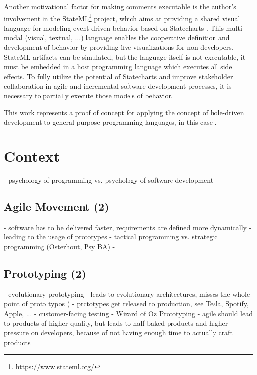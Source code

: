Another motivational factor for making comments executable is the author's involvement in the StateML\footnote{\url{https://www.stateml.org/}} project, which aims at providing a shared visual language for modeling event-driven behavior based on Statecharts \cite{Harel:1987}.
This multi-modal (visual, textual, $\dotsc$) language enables the cooperative definition and development of behavior by providing live-visualizations for non-developers.
StateML artifacts can be simulated, but the language itself is not executable, it must be embedded in a host programming language which executes all side effects.
To fully utilize the potential of Statecharts and improve stakeholder collaboration in agile and incremental software development processes, it is necessary to partially execute those models of behavior.

This work represents a proof of concept for applying the concept of hole-driven development to general-purpose programming languages, in this case \CS.



\addref
\section{Context}
- psychology of programming vs. psychology of software development
\subsection{Agile Movement (2)}
- software has to be delivered faster, requirements are defined more dynamically
- leading to the usage of prototypes
- tactical programming vs. strategic programming (Osterhout, Psy BA)
- 
\subsection{Prototyping (2)}
- evolutionary prototyping
- leads to evolutionary architectures, misses the whole point of proto typos (
- prototypes get released to production, see Tesla, Spotify, Apple, ...
- customer-facing testing
- Wizard of Oz Prototyping
- agile should lead to products of higher-quality, but leads to half-baked products and higher pressure on developers, because of not having enough time to actually craft products
